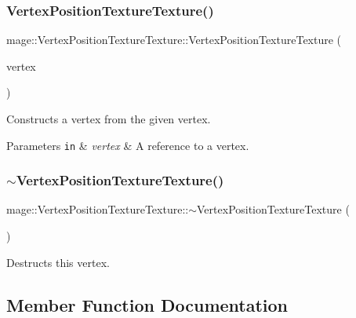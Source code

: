 \subsubsection{\texorpdfstring{Vertex\+Position\+Texture\+Texture()}{VertexPositionTextureTexture()}\hspace{0.1cm}{\footnotesize\ttfamily [3/3]}}
{\footnotesize\ttfamily mage\+::\+Vertex\+Position\+Texture\+Texture\+::\+Vertex\+Position\+Texture\+Texture (\begin{DoxyParamCaption}\item[{const \hyperlink{structmage_1_1_vertex_position_texture_texture}{Vertex\+Position\+Texture\+Texture} \&}]{vertex }\end{DoxyParamCaption})\hspace{0.3cm}{\ttfamily [default]}}

Constructs a vertex from the given vertex.


\begin{DoxyParams}[1]{Parameters}
\mbox{\tt in}  & {\em vertex} & A reference to a vertex. \\
\hline
\end{DoxyParams}
\hypertarget{structmage_1_1_vertex_position_texture_texture_a861ed56f084a3385429eae5783178529}{}\label{structmage_1_1_vertex_position_texture_texture_a861ed56f084a3385429eae5783178529} 
\subsubsection{\texorpdfstring{$\sim$\+Vertex\+Position\+Texture\+Texture()}{~VertexPositionTextureTexture()}}
{\footnotesize\ttfamily mage\+::\+Vertex\+Position\+Texture\+Texture\+::$\sim$\+Vertex\+Position\+Texture\+Texture (\begin{DoxyParamCaption}{ }\end{DoxyParamCaption})\hspace{0.3cm}{\ttfamily [default]}}

Destructs this vertex. 

\subsection{Member Function Documentation}
\hypertarget{structmage_1_1_vertex_position_texture_texture_a6880fca48f99b6a3360a41f05ca7f9fc}{}\label{structmage_1_1_vertex_position_texture_texture_a6880fca48f99b6a3360a41f05ca7f9fc} 
